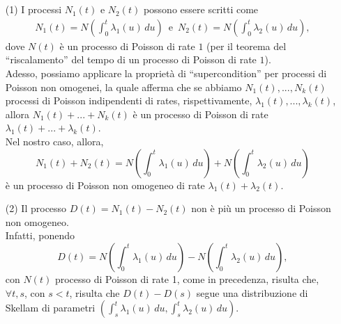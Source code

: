 \documentclass[12pt]{homework}
\begin{document}
\section{}%
\begin{enumerate}
\item[(1)]
  I processi $N_{1}\left(t\right)$ e $N_{2}\left(t\right)$ possono essere scritti come
  \begin{align*}
  N_{1}\left(t\right)=N\left(\int_{0}^{t}\lambda_{1}\left(u\right) \,du\right) \,\,\, \text{e} \,\,\, N_{2}\left(t\right)=N\left(\int_{0}^{t}\lambda_{2}\left(u\right) \,du \right),
  \end{align*}
  dove $N\left(t\right)$ è un processo di Poisson di rate $1$ (per il teorema del ``riscalamento'' del tempo di un processo di Poisson di rate $1$).\\
  Adesso, possiamo applicare la proprietà di ``supercondition'' per processi di Poisson non omogenei, la quale afferma che se abbiamo $N_{1}\left(t\right),...,N_{k}\left(t\right)$ processi di Poisson indipendenti di rates, rispettivamente, $\lambda_{1}\left(t\right),...,\lambda_{k}\left(t\right)$, allora $N_{1}\left(t\right)+...+N_{k}\left(t\right)$ è un processo di Poisson di rate $\lambda_{1}\left(t\right)+...+\lambda_{k}\left(t\right)$.\\
  Nel nostro caso, allora,
  \begin{equation*}
  N_{1}\left(t\right)+N_{2}\left(t\right)= N\left(\int_{0}^{t}\lambda_{1}\left(u\right) \,du\right) + N\left(\int_{0}^{t}\lambda_{2}\left(u\right) \,du \right)
  \end{equation*}
  è un processo di Poisson non omogeneo di rate $\lambda_{1}\left(t\right)+\lambda_{2}\left(t\right)$.\\
  \item[(2)]
  Il processo $D\left(t\right)=N_{1}\left(t\right)-N_{2}\left(t\right)$ non è più un processo di Poisson non omogeneo.\\
  Infatti, ponendo
  \begin{equation*}
  D\left(t\right)=N\left(\int_{0}^{t}\lambda_{1}\left(u\right) \,du\right) - N\left(\int_{0}^{t}\lambda_{2}\left(u\right) \,du \right),
  \end{equation*}
   con $N\left(t\right)$ processo di Poisson di rate 1, come in precedenza, risulta che, $\forall t,s$, con $s<t$, risulta che $D\left(t\right)-D\left(s\right)$ segue una distribuzione di Skellam di parametri $\left(\int_{s}^{t}\lambda_{1}\left(u\right) \,du,\int_{s}^{t}\lambda_{2}\left(u\right) \,du \right)$.\\

\end{enumerate}
\end{document}
